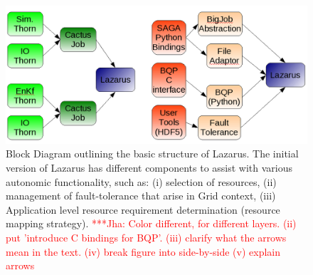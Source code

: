 \documentclass[conference,final]{IEEEtran}
\newcommand{\jhanote}[1]{ {\textcolor{red} { ***Jha: #1 }}}
\begin{document}
\begin{figure}
\begin{center}
\includegraphics[scale=0.34]{./figures/BreakdownDiagram.png}
\caption{Block Diagram outlining the basic structure of Lazarus. The
  initial version of Lazarus has different components to assist with
  various autonomic functionality, such as: (i) selection of
  resources, (ii) management of fault-tolerance that arise in Grid
  context, (iii) Application level resource requirement determination
  (resource mapping strategy).  \jhanote{Color different, for
    different layers. (ii) put 'introduce C bindings for BQP'. (iii)
    clarify what the arrows mean in the text. (iv) break figure into
    side-by-side (v) explain arrows}}
\end{center}

\label{fig:application_architecture}
\end{figure}
\end{document}
